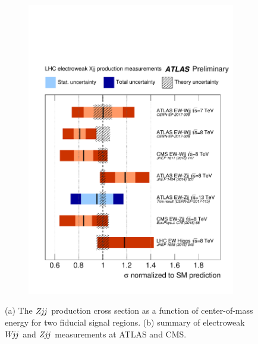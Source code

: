 \documentclass{PoS}
\def\wjj{\ensuremath{W\kern -0.2em j\kern -0.1emj}\xspace}
\def\zjj{\ensuremath{Z\kern -0.1em j\kern -0.1emj}\xspace}
\begin{document}
\begin{figure}
\begin{subfigure}[t]{0.42\textwidth}
    \includegraphics[width=.99\textwidth]{STDM-2016-09/fig_09.pdf}
    \caption{}
  \end{subfigure}%
  \caption{(a) The \zjj production cross section as a function of center-of-mass energy for two fiducial
    signal regions. (b) summary of electroweak \wjj and \zjj measurements at ATLAS and CMS.}
  \label{zjj-wjj-summary-results}
\end{figure}




\end{document}
